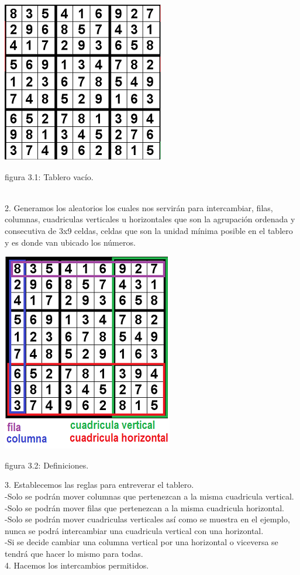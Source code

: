\documentclass[a4paper,11pt]{article}
\begin{document}
\centerline{\includegraphics{tab.png}}
\centerline{figura 3.1: Tablero vacío.}\\
2.	Generamos los aleatorios los cuales nos servirán para intercambiar, filas, columnas, cuadriculas verticales u horizontales que son la agrupación ordenada y consecutiva de 3x9 celdas, celdas que son la unidad mínima posible en el tablero y es donde van ubicado los números.

\centerline{\includegraphics{sudoResuelto.png}}
\centerline{figura 3.2: Definiciones.}

3.	Establecemos las reglas para entreverar el tablero.\\
-Solo se podrán mover columnas que pertenezcan a la misma cuadricula vertical.\\
-Solo se podrán mover filas que pertenezcan a la misma cuadricula horizontal.\\
-Solo se podrán mover cuadriculas verticales así como se muestra en el ejemplo, nunca se podrá intercambiar una cuadricula vertical con una horizontal.\\
-Si se decide cambiar una columna vertical por una horizontal o viceversa se tendrá que hacer lo mismo para todas.\\
4.	Hacemos los intercambios permitidos.\\
\end{document}
